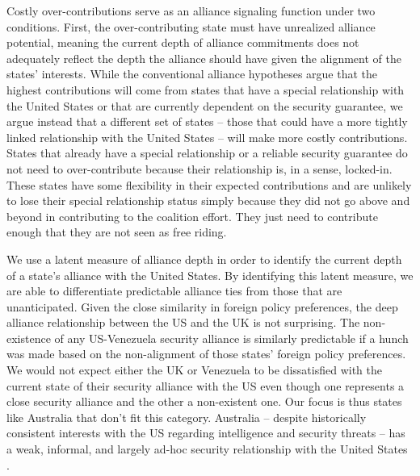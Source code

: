 \documentclass[12pt,letterpaper]{article}
\begin{document}
		Costly over-contributions serve as an alliance signaling function under two conditions. First, the over-contributing state must have unrealized alliance potential, meaning the current depth of alliance commitments does not adequately reflect the depth the alliance should have given the alignment of the states' interests. While the conventional alliance hypotheses argue that the highest contributions will come from states that have a special relationship with the United States or that are currently dependent on the security guarantee, we argue instead that a different set of states -- those that could have a more tightly linked relationship with the United States -- will make more costly contributions. States that already have a special relationship or a reliable security guarantee do not need to over-contribute because their relationship is, in a sense, locked-in. These states have some flexibility in their expected contributions and are unlikely to lose their special relationship status simply because they did not go above and beyond in contributing to the coalition effort. They just need to contribute enough that they are not seen as free riding. 

		We use a latent measure of alliance depth in order to identify the current depth of a state's alliance with the United States. By identifying this latent measure, we are able
		to differentiate predictable alliance ties from those that are unanticipated. Given the close similarity in foreign policy preferences, the deep alliance relationship between the US and the UK is not surprising. The non-existence of any US-Venezuela security alliance is similarly predictable if a hunch was made based on the non-alignment of those states' foreign policy preferences. We would not expect either the UK or Venezuela to be dissatisfied with the current state of their security alliance with the US even though one represents a close security alliance and the other a non-existent one. Our focus is thus states like Australia that don't fit this category. Australia -- despite historically consistent interests with the US regarding intelligence and security threats -- has a weak, informal, and largely ad-hoc security relationship with the United States \citep{fruhling_anzusreallyalliance_2018}.
		
\end{document}
